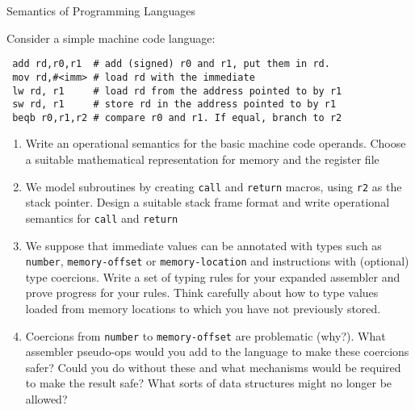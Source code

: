 \documentclass{tripos}
\begin{document}
\begin{question}[MockIB,year=2025,paper=2,question=7,author=rrw]{Semantics of Programming Languages}

  Consider a simple machine code language:

\begin{verbatim}
 add rd,r0,r1  # add (signed) r0 and r1, put them in rd.
 mov rd,#<imm> # load rd with the immediate
 lw rd, r1     # load rd from the address pointed to by r1
 sw rd, r1     # store rd in the address pointed to by r1
 beqb r0,r1,r2 # compare r0 and r1. If equal, branch to r2
\end{verbatim}

\begin{enumerate}
\item Write an operational semantics for the basic machine code operands. Choose a suitable mathematical representation for memory and the register file 
\item We model subroutines by creating \verb|call| and \verb|return| macros, using \verb|r2| as the stack pointer. Design a suitable stack frame format and write operational semantics for \verb|call| and \verb|return| 
\item We suppose that immediate values can be annotated with types such as \verb|number|, \verb|memory-offset| or \verb|memory-location| and instructions with (optional) type coercions. Write a set of typing rules for your expanded assembler and prove progress for your rules. Think carefully about how to type values loaded from memory locations to which you have not previously stored. 
\item Coercions from \verb|number| to \verb|memory-offset| are problematic (why?). What assembler pseudo-ops would you add to the language to make these coercions safer? Could you do without these and what mechanisms would be required to make the result safe? What sorts of data structures might no longer be allowed? 
\end{enumerate}
\end{question}
\end{document}
